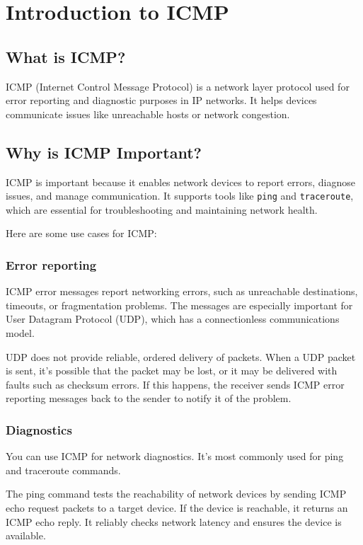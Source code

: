 \chapter{Introduction to ICMP}
\minitoc

\newpage
\section{What is ICMP?}
ICMP (Internet Control Message Protocol) is a network layer protocol used for error reporting and diagnostic purposes in IP networks. It helps devices communicate issues like unreachable hosts or network congestion.

\section{Why is ICMP Important?}
ICMP is important because it enables network devices to report errors, diagnose issues, and manage communication. It supports tools like \texttt{ping} and \texttt{traceroute}, which are essential for troubleshooting and maintaining network health.

Here are some use cases for ICMP:
\subsection{Error reporting}
ICMP error messages report networking errors, such as unreachable destinations, timeouts, or fragmentation problems. The messages are especially important for User Datagram Protocol (UDP), which has a connectionless communications model.

UDP does not provide reliable, ordered delivery of packets. When a UDP packet is sent, it’s possible that the packet may be lost, or it may be delivered with faults such as checksum errors. If this happens, the receiver sends ICMP error reporting messages back to the sender to notify it of the problem.

\subsection{Diagnostics}
You can use ICMP for network diagnostics. It’s most commonly used for ping and traceroute commands.

The ping command tests the reachability of network devices by sending ICMP echo request packets to a target device. If the device is reachable, it returns an ICMP echo reply. It reliably checks network latency and ensures the device is available.

